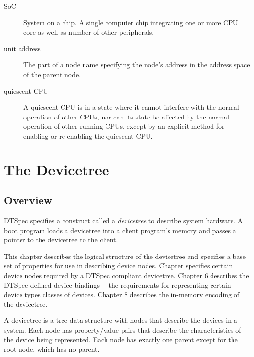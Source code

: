 \documentclass[a4paper,10pt,oneside]{sphinxmanual}
\begin{document}
\begin{description}
\item[{SoC}] \leavevmode{}\label{introduction:term-soc}
System on a chip. A single computer chip integrating one or more CPU
core as well as number of other peripherals.

\item[{unit address}] \leavevmode{}\label{introduction:term-unit-address}
The part of a node name specifying the node’s address in the address
space of the parent node.

\item[{quiescent CPU}] \leavevmode{}\label{introduction:term-quiescent-cpu}
A quiescent CPU is in a state where it cannot interfere with the
normal operation of other CPUs, nor can its state be affected by the
normal operation of other running CPUs, except by an explicit method
for enabling or re-enabling the quiescent CPU.

\end{description}


\chapter{The Devicetree}
\label{devicetree-basics:chapter-devicetree}\label{devicetree-basics:the-devicetree}\label{devicetree-basics::doc}

\section{Overview}
\label{devicetree-basics:overview}
DTSpec specifies a construct called a \emph{devicetree} to describe
system hardware. A boot program loads a devicetree into a client
program’s memory and passes a pointer to the devicetree to the client.

This chapter describes the logical structure of the devicetree and
specifies a base set of properties for use in describing device nodes.
Chapter {\hyperref[devicenodes:chapter\string-device\string-node\string-requirements]{}} specifies certain device nodes
required by a DTSpec compliant
devicetree. Chapter 6 describes the DTSpec defined device bindings— the
requirements for representing certain device types classes of devices.
Chapter 8 describes the in-memory encoding of the devicetree.

A devicetree is a tree data structure with nodes that describe the
devices in a system. Each node has property/value pairs that describe
the characteristics of the device being represented. Each node has
exactly one parent except for the root node, which has no parent.
\end{document}
